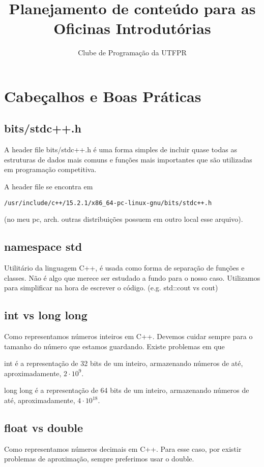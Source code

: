 \documentclass{article}
\title{Planejamento de conteúdo para as Oficinas Introdutórias}
\author{Clube de Programação da UTFPR}
\begin{document}
\maketitle
\tableofcontents

\section{Cabeçalhos e Boas Práticas}
\subsection{bits/stdc++.h}
A header file bits/stdc++.h é uma forma simples de incluir quase todas as estruturas de dados 
mais comuns e funções mais importantes que são utilizadas em programação competitiva.

A header file se encontra em 
\begin{verbatim}
/usr/include/c++/15.2.1/x86_64-pc-linux-gnu/bits/stdc++.h     
\end{verbatim}
(no meu pc, arch. outras distribuições possuem em outro local esse arquivo). 

\subsection{namespace std}
Utilitário da linguagem C++, é usada como forma de separação de funções e classes.
Não é algo que merece ser estudado a fundo para o nosso caso.
Utilizamos para simplificar na hora de escrever o código. (e.g. std::cout vs cout)

\subsection{int vs long long}
Como representamos números inteiros em C++. Devemos cuidar sempre para o tamanho do 
número que estamos guardando. Existe problemas em que  

int é a representação de 32 bits de um inteiro, armazenando números de até, 
aproximadamente, $2\cdot10^9$.

long long é a representação de 64 bits de um inteiro, armazenando números de até, 
aproximadamente, $4\cdot10^{18}$.

\subsection{float vs double}
Como representamos números decimais em C++. Para esse caso, por existir problemas de 
aproximação, sempre preferimos usar o double.
\end{document}
